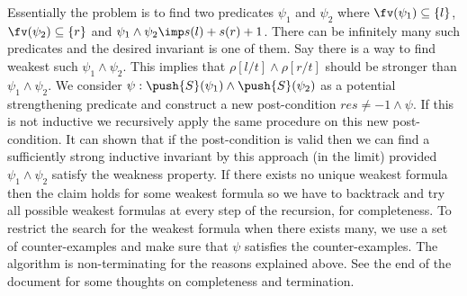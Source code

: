 Essentially the problem is to find two predicates $\psi_1$ and
$\psi_2$ where $\fv(\psi_1) \subseteq \{ l \}$, $\fv(\psi_2) \subseteq \{ r \}$ 
and $\psi_1 \wedge \psi_2 \imp s(l) + s(r) + 1$.
There can be infinitely many such predicates and the desired invariant is one of them.
Say there is a way to find weakest such  $\psi_1 \wedge \psi_2$. 
This implies that $\rho[l/t] \wedge \rho[r/t]$ should be stronger than $\psi_1 \wedge \psi_2$.
We consider $\psi: \push{S}(\psi_1) \wedge \push{S}(\psi_2)$ 
as a potential strengthening predicate and construct a new post-condition $res \ne -1 \wedge \psi$.
If this is not inductive we recursively apply the same procedure on this new post-condition.
It can shown that if the post-condition is valid then we can find a sufficiently strong 
inductive invariant by this approach (in the limit) provided $\psi_1 \wedge \psi_2$ satisfy 
the weakness property. 
If there exists no unique weakest formula then the claim holds for some weakest formula 
so we have to backtrack and try all possible weakest formulas at every step of the recursion, for completeness. 
To restrict the search for the weakest formula when there exists many, we use a set of counter-examples
and make sure that $\psi$ satisfies the counter-examples.
The algorithm is non-terminating for the reasons explained above. See the end of the document 
for some thoughts on completeness and termination.
 
